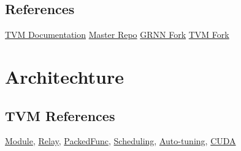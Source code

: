 \documentclass{scrreprt}
\begin{document}


\section{References}
\href{https://docs.tvm.ai/index.html}{TVM Documentation} \newline
\href{https://github.com/shamrickus/GraduateProject}{Master Repo} \newline
\href{https://github.com/shamrickus/GRNN}{GRNN Fork} \newline
\href{https://github.com/shamrickus/incubatortvm}{TVM Fork}


\chapter{Architechture}

\section{TVM References}
\href{https://docs.tvm.ai/dev/runtime.html#module}{Module},
\href{https://docs.tvm.ai/dev/relay_intro.html}{Relay},
\href{https://docs.tvm.ai/dev/runtime.html#packedfunc}{PackedFunc},
\href{https://docs.tvm.ai/tutorials/language/schedule_primitives.html}{Scheduling},
\href{https://docs.tvm.ai/tutorials/autotvm/tune_simple_template.html}{Auto-tuning},
\href{https://docs.tvm.ai/tutorials/optimize/opt_conv_cuda.html}{CUDA}
\end{document}
